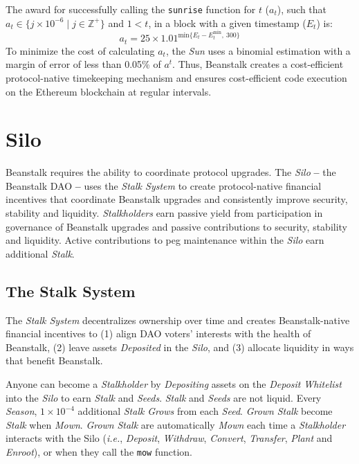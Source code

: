 \documentclass[tikz]{article}
\newcommand{\code}[1]{\texttt{#1}}
\newcommand{\term}[1]{\textsl{#1}}
\begin{document}
The award for successfully calling the \code{sunrise} function for $t$ ($a_t$), such that $a_t \in \{j \times 10^{-6} \mid j \in \mathbb{Z}^{+} \}$ and $1 < t$, in a block with a given timestamp ($E_t$) is:
$$a_t = 25 \times 1.01^{\text{min}\{{E_t - E_{t}^{\text{min}}},\ 300\}}$$
To minimize the cost of calculating $a_t$, the \term{Sun} uses a binomial estimation with a margin of error of less than 0.05\% of $a^t$. Thus, Beanstalk creates a cost-efficient protocol-native timekeeping mechanism and ensures cost-efficient code execution on the Ethereum blockchain at regular intervals.

\section{Silo}
Beanstalk requires the ability to coordinate protocol upgrades. The \term{Silo} \textbf{--} the Beanstalk DAO \textbf{--} uses the \term{Stalk System} to create protocol-native financial incentives that coordinate Beanstalk upgrades and consistently improve security, stability and liquidity. \term{Stalkholders} earn passive yield from participation in governance of Beanstalk upgrades and passive contributions to security, stability and liquidity. Active contributions to peg maintenance within the \term{Silo} earn additional \term{Stalk}.

\subsection{The Stalk System}
The \term{Stalk System} decentralizes ownership over time and creates Beanstalk-native financial incentives to (1) align DAO voters' interests with the health of Beanstalk, (2) leave assets \term{Deposited} in the \term{Silo}, and (3) allocate liquidity in ways that benefit Beanstalk.

Anyone can become a \term{Stalkholder} by \term{Depositing} assets on the \term{Deposit} \term{Whitelist} into the \term{Silo} to earn \term{Stalk} and \term{Seeds}. \term{Stalk} and \term{Seeds} are not liquid. Every \term{Season}, $1 \times 10^{-4}$ additional \term{Stalk} \term{Grows} from each \term{Seed}. \term{Grown} \term{Stalk} become \term{Stalk} when \term{Mown}. \term{Grown} \term{Stalk} are automatically \term{Mown} each time a \term{Stalkholder} interacts with the Silo (\term{i.e.}, \term{Deposit}, \term{Withdraw}, \term{Convert}, \term{Transfer}, \term{Plant} and \term{Enroot}), or when they call the \code{mow} function.
\end{document}

